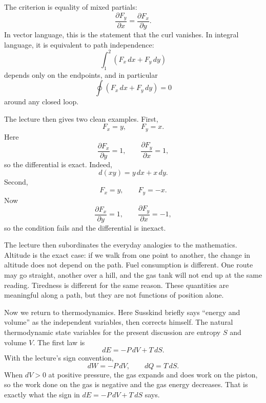 The criterion is equality of mixed partials:
\begin{equation}
\frac{\partial F_y}{\partial x}=\frac{\partial F_x}{\partial y}.
\end{equation}
In vector language, this is the statement that the curl vanishes. In integral language, it is equivalent to path independence:
\begin{equation}
\int_{1}^{2}(F_x\,dx+F_y\,dy)
\end{equation}
depends only on the endpoints, and in particular
\begin{equation}
\oint (F_x\,dx+F_y\,dy)=0
\end{equation}
around any closed loop.

The lecture then gives two clean examples. First,
\begin{equation}
F_x=y,
\qquad
F_y=x.
\end{equation}
Here
\begin{equation}
\frac{\partial F_x}{\partial y}=1,
\qquad
\frac{\partial F_y}{\partial x}=1,
\end{equation}
so the differential is exact. Indeed,
\begin{equation}
d(xy)=y\,dx+x\,dy.
\end{equation}
Second,
\begin{equation}
F_x=y,
\qquad
F_y=-x.
\end{equation}
Now
\begin{equation}
\frac{\partial F_x}{\partial y}=1,
\qquad
\frac{\partial F_y}{\partial x}=-1,
\end{equation}
so the condition fails and the differential is inexact.

The lecture then subordinates the everyday analogies to the mathematics. Altitude is the exact case: if we walk from one point to another, the change in altitude does not depend on the path. Fuel consumption is different. One route may go straight, another over a hill, and the gas tank will not end up at the same reading. Tiredness is different for the same reason. These quantities are meaningful along a path, but they are not functions of position alone.

Now we return to thermodynamics. Here Susskind briefly says ``energy and volume'' as the independent variables, then corrects himself. The natural thermodynamic state variables for the present discussion are entropy \(S\) and volume \(V\). The first law is
\begin{equation}
dE=-P\,dV+T\,dS.
\end{equation}
With the lecture's sign convention,
\begin{equation}
dW=-P\,dV,
\qquad
dQ=T\,dS.
\end{equation}
When \(dV>0\) at positive pressure, the gas expands and does work on the piston, so the work done on the gas is negative and the gas energy decreases. That is exactly what the sign in \(dE=-P\,dV+T\,dS\) says.

